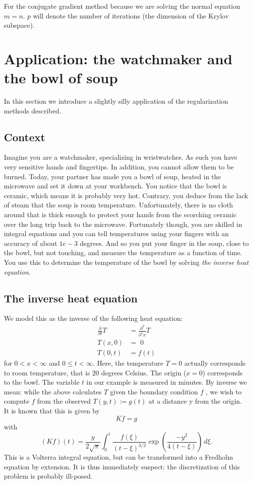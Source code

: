 \documentclass{article}
\begin{document}
	 For the conjugate gradient method because we are solving the normal equation $m=n$. $p$ will denote the number of iterations (the dimension of the Krylov subspace).
	 
	 
	
	
	\section{Application: the watchmaker and the bowl of soup}
	In this section we introduce a slightly silly application of the regularization methods described.
	\subsection{Context}
	Imagine you are a watchmaker, specializing in wristwatches. As such you have very sensitive hands and fingertips. In addition, you cannot allow them to be burned. Today, your partner has made you a bowl of soup, heated in the microwave and set it down at your workbench. You notice that the bowl is ceramic, which means it is probably very hot. Contrary, you deduce from the lack of steam that the soup is room temperature. Unfortunately, there is no cloth around that is thick enough to protect your hands from the scorching ceramic over the long trip back to the microwave. Fortunately though, you are skilled in integral equations and you can tell temperatures using your fingers with an accuracy of about $1e-3$ degrees. And so you put your finger in the soup, close to the bowl, but not touching, and measure the temperature as a function of time. You use this to determine the temperature of the bowl by solving \emph{the inverse heat equation.}
	\subsection{The inverse heat equation}
	We model this as the inverse of the following heat equation:
	\begin{align*}
		\frac{\partial}{\partial t}T\,\,\,&=\frac{\partial^2}{\partial^2x}T\\
		T(x,0)&=\,\,0\\
		T(0,t)&=f(t)
	\end{align*}
	for $0<x<\infty$ and $0\leq t<\infty$.
	Here, the temperature $T = 0$ actually corresponds to room temperature, that is $20$ degrees Celsius. The origin ($x=0$) corresponds to the bowl. The variable $t$ in our example is measured in minutes. By inverse we mean: while the above calculates $T$ given the boundary condition $f$ , we wish to compute $f$ from the observed $T(y, t) := g(t)$ at a distance y from the origin. It is known that this is given by
	$$Kf=g$$
	with
	$$(Kf)(t)=\frac{y}{2\sqrt{\pi}}\int_0^t\frac{f(\xi)}{(t-\xi)^{3/2}}\exp(\frac{-y^2}{4(t-\xi)})\,d\xi.$$
	This is a Volterra integral equation, but can be transformed into a Fredholm equation by extension. It is thus immediately suspect: the discretization of this problem is probably ill-posed.
\end{document}
